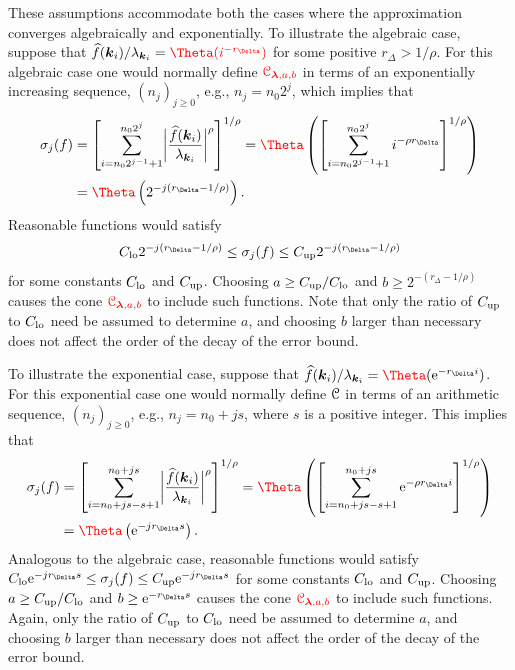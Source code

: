 \documentclass[USenglish]{article}
\theoremstyle{dgthm}
\theoremstyle{dgthm}
\theoremstyle{dgthm}
\theoremstyle{dgthm}
\theoremstyle{dgdef}
\theoremstyle{definition}
\newcommand{\hf}{\widehat{f}}
\newcommand{\lo}{\textup{lo}}
\newcommand{\up}{\textup{up}}
\newcommand{\E}{\textup{e}}
\newcommand{\biggabs}[1]{\ensuremath{\biggl \lvert #1 \biggr \rvert}}
\newcommand{\DHKMchange}[1]{{\color{red}{#1}}}
\begin{document}
These assumptions accommodate both the cases where the approximation converges algebraically and exponentially.  To illustrate the algebraic case, suppose that $\hf(\bsk_i)/\lambda_{\bsk_i} = \DHKMchange{\Theta(i^{-r_\Delta})}$ for some positive $r_\Delta > 1/\rho$.  For this algebraic case one would normally define $\DHKMchange{\calC_{\boldsymbol{\lambda},a,b}} $ in terms of an exponentially increasing sequence, $(n_j)_{j\ge 0}$, e.g., $n_j = n_0 2^j$, which implies that 
\begin{align*}
    \sigma_j(f) &= \left[ \sum_{i=n_0 2^{j-1} + 1}^{n_0 2^j} \biggabs{\frac{\hf(\bsk_i)}{\lambda_{\bsk_i}}}^\rho \right]^{1/\rho}
    = \DHKMchange{\Theta}\left( \left [ \sum_{i=n_0 2^{j-1} + 1}^{n_0 2^j} i^{-\rho r_\Delta} \right]^{1/\rho} \right) \\
    & =\DHKMchange{\Theta}\left(  2^{-j(r_\Delta-1/\rho)} \right).
\end{align*}
Reasonable functions would satisfy 
\begin{equation*}
    C_{\lo} 2^{-j(r_\Delta-1/\rho)} \le \sigma_j(f) \le C_{\up} 2^{-j(r_\Delta-1/\rho)} 
\end{equation*}
for some constants $C_{\lo}$ and $C_{\up}$.  Choosing $a \ge C_{\up}/C_{\lo} $  and $b \ge  2^{-(r_\Delta-1/\rho)}$ causes the cone $\DHKMchange{\calC_{\boldsymbol{\lambda},a,b}}$ to include such functions.  Note that only the ratio of $C_{\up}$ to $C_{\lo}$ need be assumed to determine $a$, and choosing $b$ larger than necessary does not affect the order of the decay of the error bound. 

To illustrate the exponential case, suppose that $\hf(\bsk_i)/\lambda_{\bsk_i} = \DHKMchange{\Theta}(\E^{-r_\Delta i})$.  For this exponential case one would normally define ${\mathcal{C}}$ in terms of an arithmetic sequence, $(n_j)_{j\ge 0}$, e.g., $n_j = n_0 + j s$, where $s$ is a positive integer.  This implies that 
\begin{align*}
    \sigma_j(f) &= \left[ \sum_{i=n_0 + j s -s + 1}^{n_0 + j s} \biggabs{\frac{\hf(\bsk_i)}{\lambda_{\bsk_i}}}^\rho \right]^{1/\rho}
    = \DHKMchange{\Theta} \left( \left [ \sum_{i=n_0 + j s -s + 1}^{n_0 + j s} \E^{- \rho r_\Delta i} \right]^{1/\rho} \right) \\
    & = \DHKMchange{\Theta} \left(  \E^{-j r_{\Delta} s} \right).
\end{align*}
Analogous to the algebraic case, reasonable functions would satisfy 
    $C_{\lo} \E^{-j r_{\Delta} s} \le \sigma_j(f) \le C_{\up} \E^{-j r_{\Delta} s}$
for some constants $C_{\lo}$ and $C_{\up}$.  Choosing $a \ge C_{\up}/C_{\lo} $  and $b \ge \E^{- r_{\Delta} s}$ causes the cone $\DHKMchange{\calC_{\boldsymbol{\lambda},a,b}}$ to include such functions.  Again, only the ratio of $C_{\up}$ to $C_{\lo}$ need be assumed to determine $a$, and choosing $b$ larger than necessary does not affect the order of the decay of the error bound.
\end{document}

